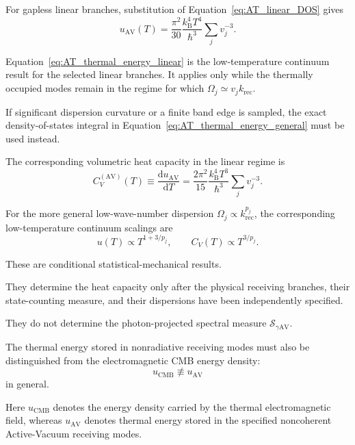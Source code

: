 For gapless linear branches,
substitution of
Equation~\eqref{eq:AT_linear_DOS}
gives
\begin{equation}
    u_{\mathrm{AV}}(T)
    =
    \frac{\pi^2}{30}
    \frac{k_{\mathrm B}^4T^4}{\hbar^3}
    \sum_j
    v_j^{-3}.
    \label{eq:AT_thermal_energy_linear}
\end{equation}

Equation~\eqref{eq:AT_thermal_energy_linear}
is the low-temperature continuum result for the selected linear branches.
It applies only while the thermally occupied modes remain in the regime for
which
\(\Omega_j\simeq v_jk_{\mathrm{rec}}\).

If significant dispersion curvature or a finite band edge is sampled, the
exact density-of-states integral in
Equation~\eqref{eq:AT_thermal_energy_general}
must be used instead.

The corresponding volumetric heat capacity in the linear regime is
\begin{equation}
    C_V^{(\mathrm{AV})}(T)
    \equiv
    \frac{\mathrm du_{\mathrm{AV}}}{\mathrm dT}
    =
    \frac{2\pi^2}{15}
    \frac{k_{\mathrm B}^4T^3}{\hbar^3}
    \sum_j
    v_j^{-3}.
    \label{eq:AT_heat_capacity_linear}
\end{equation}

For the more general low-wave-number dispersion
\(\Omega_j\propto k_{\mathrm{rec}}^{p_j}\),
the corresponding low-temperature continuum scalings are
\begin{equation}
    u(T)
    \propto
    T^{1+3/p_j},
    \qquad
    C_V(T)
    \propto
    T^{3/p_j}.
    \label{eq:AT_general_thermal_scaling}
\end{equation}

These are conditional statistical-mechanical results.

They determine the heat capacity only after the physical receiving branches,
their state-counting measure, and their dispersions have been independently
specified.

They do not determine the photon-projected spectral measure
\(\mathcal S_{\gamma\mathrm{AV}}\).

The thermal energy stored in nonradiative receiving modes must also be
distinguished from the electromagnetic CMB energy density:
\begin{equation}
    u_{\mathrm{CMB}}
    \not\equiv
    u_{\mathrm{AV}}
    \label{eq:AT_radiative_thermal_distinction}
\end{equation}
in general.

Here
\(u_{\mathrm{CMB}}\)
denotes the energy density carried by the thermal electromagnetic field,
whereas
\(u_{\mathrm{AV}}\)
denotes thermal energy stored in the specified noncoherent Active-Vacuum
receiving modes.

